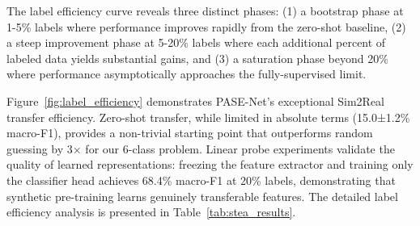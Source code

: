 \documentclass[lettersize,journal]{IEEEtran}
\begin{document}
The label efficiency curve reveals three distinct phases: (1) a bootstrap phase at 1-5\% labels where performance improves rapidly from the zero-shot baseline, (2) a steep improvement phase at 5-20\% labels where each additional percent of labeled data yields substantial gains, and (3) a saturation phase beyond 20\% where performance asymptotically approaches the fully-supervised limit.

Figure~\ref{fig:label_efficiency} demonstrates PASE-Net's exceptional Sim2Real transfer efficiency. Zero-shot transfer, while limited in absolute terms (15.0±1.2\% macro-F1), provides a non-trivial starting point that outperforms random guessing by 3× for our 6-class problem. Linear probe experiments validate the quality of learned representations: freezing the feature extractor and training only the classifier head achieves 68.4\% macro-F1 at 20\% labels, demonstrating that synthetic pre-training learns genuinely transferable features. The detailed label efficiency analysis is presented in Table~\ref{tab:stea_results}.
\end{document}
